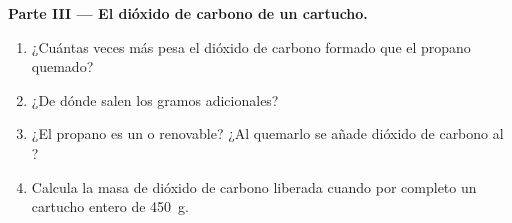 \begin{problem}
\medskip
\noindent\textbf{Parte III --- El dióxido de carbono de un cartucho.}
\begin{enumerate}[resume]
  \item ¿Cuántas veces más pesa el dióxido de carbono formado que el
        propano quemado?
  \item ¿De dónde salen los gramos adicionales?
  \item ¿El propano es un  o renovable? ¿Al quemarlo se
        añade dióxido de carbono al ?
  \item Calcula la masa de dióxido de carbono liberada cuando  por
        completo un cartucho entero de \qty{450}{g}.
\end{enumerate}
\end{problem}
